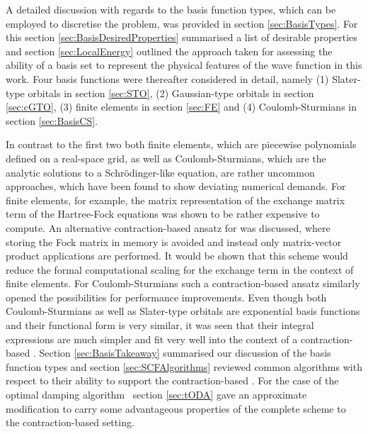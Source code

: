 
A detailed discussion with regards to the basis function types,
which can be employed to discretise the \HF problem,
was provided in section \ref{sec:BasisTypes}.
For this section \ref{sec:BasisDesiredProperties}
summarised a list of desirable properties
and section \ref{sec:LocalEnergy}
outlined the approach taken for
assessing the ability of a basis set to represent the physical
features of the wave function in this work.
Four basis functions were thereafter considered in detail,
namely (1) Slater-type orbitals in section \ref{sec:STO},
(2) Gaussian-type orbitals in section \ref{sec:cGTO},
(3) finite elements in section \ref{sec:FE}
and (4) Coulomb-Sturmians in section \ref{sec:BasisCS}.

In contrast to the first two
both finite elements,
which are piecewise polynomials defined on a real-space grid,
as well as Coulomb-Sturmians,
which are the analytic solutions to a Schrödinger-like equation,
are rather uncommon approaches,
which have been found to show deviating numerical demands.
For finite elements, for example,
the matrix representation of the exchange matrix term of the Hartree-Fock equations
was shown to be rather expensive to compute.
An alternative contraction-based ansatz for \HF was discussed,
where storing the Fock matrix in memory is avoided
and instead only matrix-vector product applications are performed.
It would be shown that this scheme would reduce
the formal computational scaling
for the exchange term in the context of finite elements.
For Coulomb-Sturmians such a contraction-based \SCF
ansatz similarly opened the possibilities for performance improvements.
Even though both Coulomb-Sturmians as well as Slater-type
orbitals are exponential basis functions
and their functional form is very similar,
it was seen that their integral expressions are much simpler
and fit very well into the context of a contraction-based \SCF.
Section \ref{sec:BasisTakeaway} summarised our discussion of the basis
function types and section \ref{sec:SCFAlgorithms}
reviewed common \SCF algorithms
with respect to their ability to support the contraction-based \SCF.
For the case of the optimal damping algorithm~\cite{Cances2000a}
section \ref{sec:tODA} gave an approximate modification
to carry some advantageous
properties of the complete scheme to the contraction-based setting.


